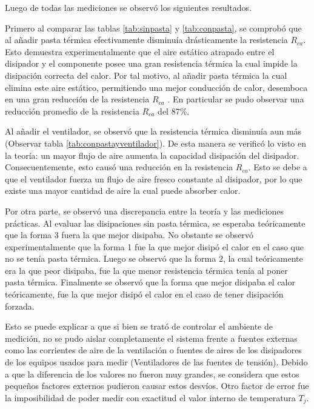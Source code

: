 \documentclass{article}
\begin{document}
Luego de todas las mediciones se observó los siguientes resultados.\par
 Primero al comparar las tablas \ref{tab:sinpasta} y \ref{tab:conpasta}, se comprobó que al añadir pasta térmica efectivamente disminuía drásticamente la resistencia $R_{ca}$. Esto demuestra experimentalmente que el aire estático atrapado entre el disipador y el componente posee una gran resistencia térmica la cual impide la disipación correcta del calor. Por tal motivo, al añadir pasta térmica la cual elimina este aire estático, permitiendo una mejor conducción de calor, desemboca en una gran reducción de la resistencia $R_{ca}$ . En particular se pudo observar una reducción promedio de la resistencia $R_{ca}$ del 87\%. \par
 
 Al añadir el ventilador, se observó que la resistencia térmica disminuía aun más (Observar tabla \ref{tab:conpastayventilador}). De esta manera se verificó lo visto en la teoría: un mayor flujo de aire aumenta la capacidad disipación del disipador. Consecuentemente, esto causó una reducción en la resistencia $R_{ca}$. Esto se debe a que el ventilador fuerza un flujo de aire fresco constante al disipador, por lo que existe una mayor cantidad de aire la cual puede absorber calor.\par
 
 Por otra parte, se observó una discrepancia entre la teoría y las mediciones prácticas. Al evaluar las disipaciones sin pasta térmica, se esperaba teóricamente que la forma 3 fuera la que mejor disipaba. No obstante se observó experimentalmente que la forma 1 fue la que mejor disipó el calor en el caso que no se tenía pasta térmica. Luego se observó que la forma 2, la cual teóricamente era la que peor disipaba, fue la que menor resistencia térmica tenía al poner pasta térmica. Finalmente se observó que la forma que mejor disipaba el calor teóricamente, fue la que mejor disipó el calor en el caso de tener disipación forzada. \par
 
 Esto se puede explicar a que si bien se trató de controlar el ambiente de medición, no se pudo aislar completamente el sistema frente a fuentes externas como las corrientes de aire de la ventilación o fuentes de aires de los disipadores de los equipos usados para medir (Ventiladores de las fuentes de tensión). Debido a que la diferencia de los valores no fueron muy grandes, se considera que estos pequeños factores externos pudieron causar estos desvíos. Otro factor de error fue la imposibilidad de poder medir con exactitud el valor interno de temperatura $T_j$. 
 
\end{document}
